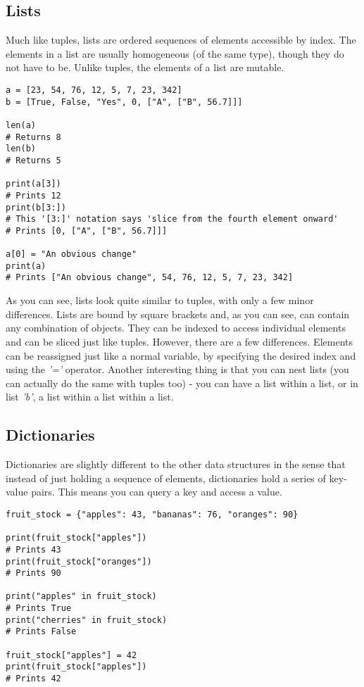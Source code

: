 \documentclass{article}
\begin{document}
\subsection{Lists}
Much like tuples, lists are ordered sequences of elements accessible by index. The elements in a list are usually homogeneous (of the same type), though they do not have to be. Unlike tuples, the elements of a list are mutable.

\begin{verbatim}
a = [23, 54, 76, 12, 5, 7, 23, 342]
b = [True, False, "Yes", 0, ["A", ["B", 56.7]]]

len(a)
# Returns 8
len(b)
# Returns 5

print(a[3])
# Prints 12
print(b[3:])
# This '[3:]' notation says 'slice from the fourth element onward'
# Prints [0, ["A", ["B", 56.7]]]

a[0] = "An obvious change"
print(a)
# Prints ["An obvious change", 54, 76, 12, 5, 7, 23, 342]
\end{verbatim}

As you can see, lists look quite similar to tuples, with only a few minor differences. Lists are bound by square brackets and, as you can see, can contain any combination of objects. They can be indexed to access individual elements and can be sliced just like tuples. However, there are a few differences. Elements can be reassigned just like a normal variable, by specifying the desired index and using the \textit{'='} operator. Another interesting thing is that you can nest lists (you can actually do the same with tuples too) - you can have a list within a list, or in list \textit{'b'}, a list within a list within a list.

\subsection{Dictionaries}
Dictionaries are slightly different to the other data structures in the sense that instead of just holding a sequence of elements, dictionaries hold a series of key-value pairs. This means you can query a key and access a value.

\begin{verbatim}
fruit_stock = {"apples": 43, "bananas": 76, "oranges": 90}

print(fruit_stock["apples"])
# Prints 43
print(fruit_stock["oranges"])
# Prints 90

print("apples" in fruit_stock)
# Prints True
print("cherries" in fruit_stock)
# Prints False

fruit_stock["apples"] = 42
print(fruit_stock["apples"])
# Prints 42
\end{verbatim}
\end{document}
